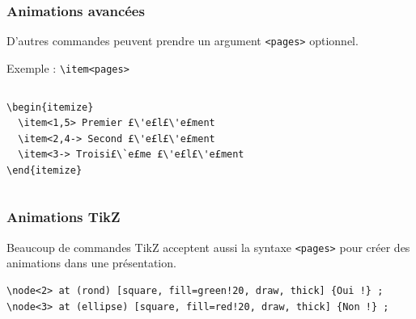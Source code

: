 \begin{frame}[fragile]
  \frametitle{Animations avancées}

D'autres commandes peuvent prendre un argument \lstinline?<pages>? optionnel.

\bigskip
Exemple : \lstinline?\item<pages>?
\begin{columns}
  \begin{column}{0.40\textwidth}
\begin{lstlisting}
\begin{itemize}
  \item<1,5> Premier £\'e£l£\'e£ment
  \item<2,4-> Second £\'e£l£\'e£ment
  \item<3-> Troisi£\`e£me £\'e£l£\'e£ment
\end{itemize}\end{lstlisting}
  \end{column}
  \begin{column}{0.40\textwidth}
  \end{column}
\end{columns}

\pause[5]
\end{frame}



\begin{frame}[fragile, t]
  \frametitle{Animations TikZ}

\begin{figure}
\end{figure}

\bigskip
Beaucoup de commandes TikZ acceptent aussi la syntaxe \lstinline?<pages>? pour créer des animations dans une présentation.

\bigskip
\begin{lstlisting}
\node<2> at (rond) [square, fill=green!20, draw, thick] {Oui !} ;
\node<3> at (ellipse) [square, fill=red!20, draw, thick] {Non !} ;
\end{lstlisting}
\end{frame}




